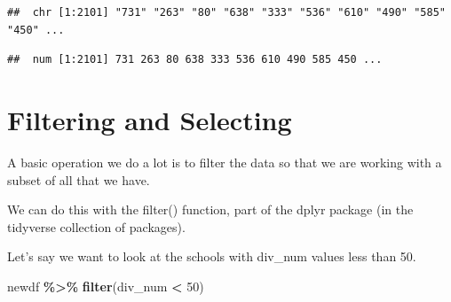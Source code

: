 \documentclass[
]{book}
\newenvironment{Shaded}{\begin{snugshade}}{\end{snugshade}}
\newcommand{\DecValTok}[1]{\textcolor[rgb]{0.00,0.00,0.81}{#1}}
\newcommand{\KeywordTok}[1]{\textcolor[rgb]{0.13,0.29,0.53}{\textbf{#1}}}
\newcommand{\NormalTok}[1]{#1}
\newcommand{\OperatorTok}[1]{\textcolor[rgb]{0.81,0.36,0.00}{\textbf{#1}}}
\newcommand{\StringTok}[1]{\textcolor[rgb]{0.31,0.60,0.02}{#1}}
\begin{document}
\begin{verbatim}
##  chr [1:2101] "731" "263" "80" "638" "333" "536" "610" "490" "585" "450" ...
\end{verbatim}

\begin{Shaded}
\end{Shaded}

\begin{verbatim}
##  num [1:2101] 731 263 80 638 333 536 610 490 585 450 ...
\end{verbatim}

\hypertarget{filtering-and-selecting}{%
\section{Filtering and Selecting}\label{filtering-and-selecting}}

A basic operation we do a lot is to filter the data so that we are working with a subset of all that we have.

We can do this with the filter() function, part of the dplyr package (in the tidyverse collection of packages).

Let's say we want to look at the schools with div\_num values less than 50.

\begin{Shaded}
\begin{Highlighting}[]
\NormalTok{newdf }\OperatorTok{\%\textgreater{}\%}\StringTok{ }\KeywordTok{filter}\NormalTok{(div\_num }\OperatorTok{\textless{}}\StringTok{ }\DecValTok{50}\NormalTok{)}
\end{Highlighting}
\end{Shaded}
\end{document}
